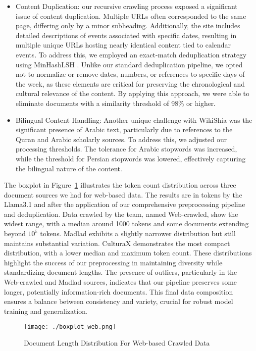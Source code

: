 \begin{itemize}
    \item Content Duplication: our recursive crawling process exposed a significant issue of content duplication. Multiple URLs often corresponded to the same page, differing only by a minor subheading. Additionally, the site includes detailed descriptions of events associated with specific dates, resulting in multiple unique URLs hosting nearly identical content tied to calendar events.
    To address this, we employed an exact-match deduplication strategy using MinHashLSH \citep{leskovec2020lsh}. Unlike our standard deduplication pipeline, we opted not to normalize or remove dates, numbers, or references to specific days of the week, as these elements are critical for preserving the chronological and cultural relevance of the content. By applying this approach, we were able to eliminate documents with a similarity threshold of 98\% or higher.

    \item Bilingual Content Handling: Another unique challenge with WikiShia was the significant presence of Arabic text, particularly due to references to the Quran and Arabic scholarly sources. To address this, we adjusted our processing thresholds. The tolerance for Arabic stopwords was increased, while the threshold for Persian stopwords was lowered, effectively capturing the bilingual nature of the content.
\end{itemize}

The boxplot in Figure~\ref{fig:baxplot3} illustrates the token count distribution across three document sources we had for web-based data. The results are in tokens by the Llama3.1 \citep{dubey2024llama3.1} and after the application of our comprehensive preprocessing pipeline and deduplication. Data crawled by the team, named Web-crawled, show the widest range, with a median around 1000 tokens and some documents extending beyond \(10^5\) tokens. Madlad exhibits a slightly narrower distribution but still maintains substantial variation. CulturaX demonstrates the most compact distribution, with a lower median and maximum token count. These distributions highlight the success of our preprocessing in maintaining diversity while standardizing document lengths. The presence of outliers, particularly in the Web-crawled and Madlad sources, indicates that our pipeline preserves some longer, potentially information-rich documents. This final data composition ensures a balance between consistency and variety, crucial for robust model training and generalization.
\begin{figure}[t]
  \texttt{[image: ./boxplot\_web.png]}
  \caption{Document Length Distribution For Web-based Crawled Data}
  \label{fig:baxplot3}
\end{figure}
